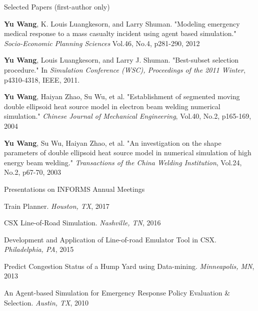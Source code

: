 

\begin{cventries}

\cventry
{Selected Papers (first-author only)}      %
{}                            %
{}                                         %
{}                                         %
{
\begin{cvitems} %
    \item {
\textbf{Yu Wang}, K. Louis Luangkesorn, and Larry Shuman. "Modeling emergency medical response to a mass casualty incident using agent based simulation." \textit{Socio-Economic Planning Sciences} Vol.46, No.4, p281-290, 2012
	}
    \item {
\textbf{Yu Wang}, Louis Luangkesorn, and Larry J. Shuman. "Best-subset selection procedure." In 
\textit{Simulation Conference (WSC), Proceedings of the 2011 Winter}, p4310-4318, IEEE, 2011.
	}
	\item {
\textbf{Yu Wang}, Haiyan Zhao, Su Wu, et al. "Establishment of segmented moving double ellipsoid heat source model in electron beam welding numerical simulation." 
\textit{Chinese Journal of Mechanical Engineering}, Vol.40, No.2, p165-169, 2004
	}
    \item {
\textbf{Yu Wang}, Su Wu, Haiyan Zhao, et al. "An investigation on the shape parameters of double ellipsoid heat source model in numerical simulation of high energy beam welding." 
\textit{Transactions of the China Welding Institution}, Vol.24, No.2, p67-70, 2003
	}	
\end{cvitems}
}

\cventry
{Presentations on INFORMS Annual Meetings}      %
{}                            %
{}                                         %
{}                                         %
{
\begin{cvitems} %
    \item {
Train Planner. \textit{Houston, TX}, 2017
	}
    \item {
CSX Line-of-Road Simulation. \textit{Nashville, TN}, 2016
	}
    \item {
Development and Application of Line-of-road Emulator Tool in CSX. \textit{Philadelphia, PA}, 2015
	}
	\item {
Predict Congestion Status of a Hump Yard using Data-mining. \textit{Minneapolis, MN}, 2013
	}
    \item {
An Agent-based Simulation for Emergency Response Policy Evaluation \& Selection. \textit{Austin, TX}, 2010
	}	
\end{cvitems}
}

\end{cventries}
